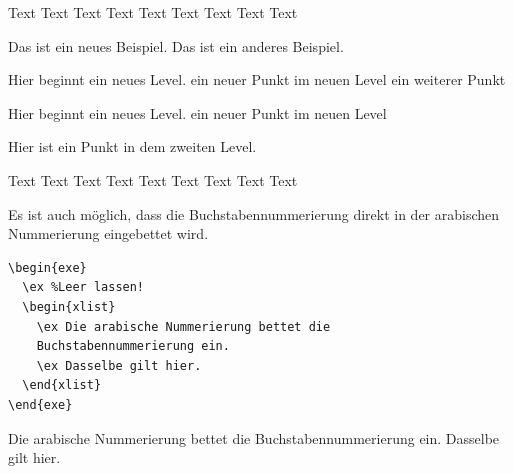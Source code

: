 \begin{frame}[fragile]


Text Text Text Text Text Text Text Text Text 
\begin{exe}
	\ex Das ist ein neues Beispiel. 	
	\ex Das ist ein anderes Beispiel.
	\begin{xlist}
		\ex Hier beginnt ein neues Level.
		\ex ein neuer Punkt im neuen Level
		\ex ein weiterer Punkt
		\begin{xlist}
			\ex Hier beginnt ein neues Level.
			\ex ein neuer Punkt im neuen Level
		\end{xlist}
		\ex Hier ist ein Punkt in dem zweiten Level.
	\end{xlist}		
\end{exe}	
Text Text Text Text Text Text Text Text Text 
\end{frame}


\begin{frame}[fragile]

Es ist auch möglich, dass die Buchstabennummerierung direkt in der arabischen Nummerierung eingebettet wird.

\begin{lstlisting}
\begin{exe}
  \ex %Leer lassen!
  \begin{xlist}
    \ex Die arabische Nummerierung bettet die 
    Buchstabennummerierung ein.
    \ex Dasselbe gilt hier.
  \end{xlist}		
\end{exe}	
\end{lstlisting}


\begin{exe}
	\ex %
	\begin{xlist}
		\ex Die arabische Nummerierung bettet die Buchstabennummerierung ein.
		\ex Dasselbe gilt hier.
	\end{xlist}		
\end{exe}	
\end{frame}


